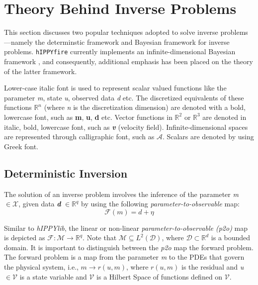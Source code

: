 \chapter{Theory Behind Inverse Problems}
\label{chapter: inverse-problems}
This section discusses two popular techniques adopted to solve inverse problems---namely the determinstic framework \cite{laloy2019gradient, vogel2002deterministic} and Bayesian framework \cite{dashti2017bayesian, stuart2010inverse} for inverse problems. \texttt{hIPPYfire} currently implements an infinite-dimensional Bayesian framework \cite{thanh2013infinitebayesian}, and consequently, additional emphasis has been placed on the theory of the latter framework.

Lower-case italic font is used to represent scalar valued functions like the parameter \textit{m}, state \textit{u}, observed data \textit{d} etc. The discretized equivalents of these functions $\mathbb{R}^n$ (where \textit{n} is the discretization dimension) are denoted with a bold, lowercase font, such as \textbf{m}, \textbf{u}, \textbf{d} etc. Vector functions in $\mathbb{R}^2$ or $\mathbb{R}^3$ are denoted in italic, bold, lowercase font, such as \textbf{\textit{v}} (velocity field). Infinite-dimensional spaces are represented through calligraphic font, such as $\mathcal{A}$. Scalars are denoted by using Greek font.


\section{Deterministic Inversion}
\label{sec:det_inversion}

The solution of an inverse problem involves the inference of the parameter \textit{m} $\in \mathcal{X}$, given data \textit{\textbf{d}} $ \in \mathbb{R}^q$ by using the following \textit{parameter-to-observable} map:
\begin{equation}
\label{eqn:fwd_map}
    \mathcal{F}(m) = d + \eta
\end{equation}

Similar to \textit{hIPPYlib}, the linear or non-linear \textit{parameter-to-observable (p2o)} map is depicted as $\mathcal{F} : \mathcal{M} \rightarrow \mathbb{R}^q$. Note that $\mathcal{M} \subseteq L^2(\mathcal{D})$, where $\mathcal{D} \subset \mathbb{R}^d$ is a bounded domain.  It is important to distinguish between the \textit{p2o} map the forward problem. The forward problem is a map from the parameter \textit{m} to the PDEs that govern the physical system, i.e., $m \rightarrow r(u, m)$, where $r(u, m)$ is the residual and \textit{u} $\in \mathcal{V}$ is a state variable and $\mathcal{V}$ is a Hilbert Space of functions defined on $\mathcal{V}$.

